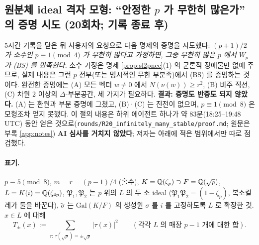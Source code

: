 \subsection{원분체 ideal 격자 모형: ``안정한 $p$ 가 무한히 많은가'' 의 증명 시도 (20회차; 기록 종료 후)}\label{sec:r20}
5시간 기록을 닫은 뒤 사용자의 요청으로 다음 명제의 증명을 시도했다: \emph{$(p+1)/2$ 가 소수인 $p\equiv1\pmod4$ 가 무한히 많다고 가정하면, 그중 무한히 많은 $p$ 에서 $W_p$ 가 (BS) 를 만족한다.} 소수 가정은 명제 \ref{prop:sl2pnec}(1) 의 군론적 장애물만 없애 주므로, 실제 내용은 그런 $p$ 전부(또는 명시적인 무한 부분족)에서 (BS) 를 증명하는 것이다. 완전한 증명에는 (A) 모든 벡터 $w\ne0$ 에서 $N(\nu(w))\ge r^2$, (B) 비주 직선, (C) 차원 2 이상의 $\Delta$-부분공간, 세 가지가 필요하다. \textbf{결과: 증명도 반증도 되지 않았다.} (A) 는 환원과 부분 증명에 그쳤고, (B)·(C) 는 진전이 없으며, $p\equiv1\pmod8$ 은 모형조차 얻지 못했다. 이 절의 내용은 하위 에이전트 하나가 약 83분(18:25--19:48 UTC) 동안 얻은 것으로(\texttt{rounds/R20\_infinitely\_many\_stable/proof.md}; 원문은 부록 \ref{app:notes}) \textbf{AI 심사를 거치지 않았다}; 저자는 아래에 적은 범위에서만 따로 점검했다.

\paragraph{표기.} $p\equiv5\pmod8$, $m=r=(p-1)/4$ (홀수), $K=\mathbb{Q}(\zeta_p)\supset F=\mathbb{Q}(\sqrt p)$, $L=K(i)=\mathbb{Q}(\zeta_{4p})$, $\mathfrak P_1,\mathfrak P_2$ 는 $p$ 위의 $L$ 의 두 소 ideal ($\mathfrak P_1\mathfrak P_2=(1-\zeta_p)$, 복소켤레가 둘을 바꾼다), $\tilde\sigma$ 는 $\mathrm{Gal}(K/F)$ 의 생성원 $\sigma$ 를 $i$ 를 고정하도록 $L$ 로 확장한 것. $x\in L$ 에 대해
\[
T_\pm(x):=\sum_{\tau:\ \tau(\sqrt p)=\pm\sqrt p}|\tau(x)|^2\qquad(\text{각각 $L$ 의 매장 $p-1$ 개에 대한 합}).
\]

